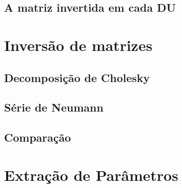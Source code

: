 \subsection{A matriz invertida em cada DU}\label{subsec:Gc}

\section{Inversão de matrizes}

\subsection{Decomposição de Cholesky}

\subsection{Série de Neumann}

\subsection{Comparação}

\section{Extração de Parâmetros}
